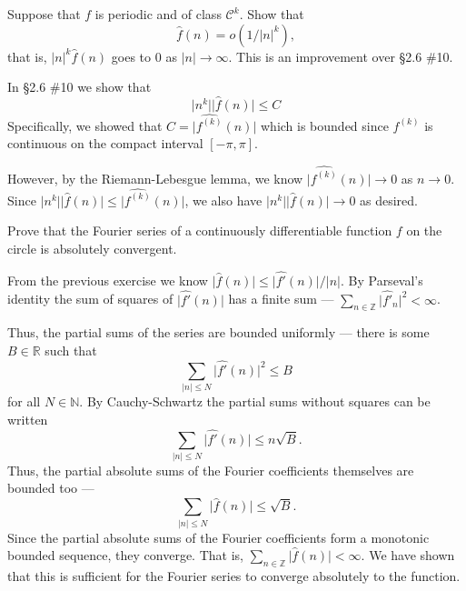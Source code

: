 \documentclass[12 pt, letterpaper]{hmcpset}
\begin{document}
\pagebreak

\begin{problem}[S \& S \S 3.3 \#13.]
	Suppose that $f$ is periodic and of class $\mathcal{C}^{k}$. Show that
	\[
		\hat{f}(n) = o(1 / \lvert n \rvert^{k}),
	\]
	that is, $\lvert n \rvert^{k} \hat{f}(n)$ goes to $0$ as $\lvert n \rvert \to \infty$. This is an improvement over \S 2.6 \#10.
\end{problem}

\begin{solution}
	In \S 2.6 \#10 we show that
	 \[
		\lvert n^{k} \rvert \lvert \hat{f}(n) \rvert \le C
	\]
	Specifically, we showed that $C = \lvert \widehat{f^{(k)}}(n) \rvert$ which is bounded since  $f^{(k)}$ is continuous on the compact interval $[-\pi, \pi]$.

	However, by the Riemann-Lebesgue lemma, we know $\lvert \widehat{f^{(k)}}(n) \rvert \to 0$ as $n \to 0$. Since $\lvert n^{k} \rvert \lvert \hat{f}(n) \rvert \le \lvert \widehat{f^{(k)}}(n) \rvert$, we also have $\lvert n^{k} \rvert \lvert \hat{f}(n) \rvert \to 0$ as desired.
\end{solution}

\pagebreak

\begin{problem}[S \& S \S 3.3 \#14.]
	Prove that the Fourier series of a continuously differentiable function $f$ on the circle is absolutely convergent.
\end{problem}

\begin{solution}
	From the previous exercise we know $\lvert \hat{f}(n) \rvert \le \lvert \widehat{f'}(n) \rvert / \lvert n \rvert$. By Parseval's identity the sum of squares of $\lvert \widehat{f'}(n) \rvert$ has a finite sum --- $\sum_{n \in \mathbb{Z}} \lvert \widehat{f'}_{n} \rvert^{2} < \infty$. 

	Thus, the partial sums of the series are bounded uniformly --- there is some $B \in \mathbb{R}$ such that
	\[
		\sum_{\lvert n \rvert \le N} \lvert \widehat{f'}(n) \rvert^{2} \le B
	\]
	for all $N \in \mathbb{N}$. By Cauchy-Schwartz the partial sums without squares can be written
	\[
		\sum_{\lvert n \rvert \le N} \lvert \widehat{f'}(n) \rvert \le n \sqrt{B}.
	\]
	Thus, the partial absolute sums of the Fourier coefficients themselves are bounded too ---
	\[
		\sum_{\lvert n \rvert \le N} \lvert \hat{f}(n) \rvert \le \sqrt{B}.
	\]
	Since the partial absolute sums of the Fourier coefficients form a monotonic bounded sequence, they converge. That is, $\sum_{n \in \mathbb{Z}} \lvert \hat{f}(n) \rvert < \infty$. We have shown that this is sufficient for the Fourier series to converge absolutely to the function.
\end{solution}
\end{document}
